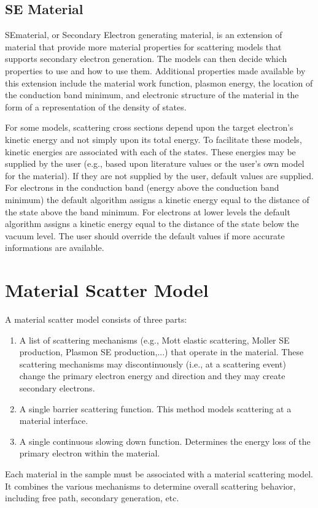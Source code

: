 \subsection{SE Material}\label{subsec:sematerial}
SEmaterial, or Secondary Electron generating material, is an extension of material that provide more material properties for scattering models that supports secondary electron generation. The models can then decide which properties to use and how to use them. Additional properties made available by this extension include the material work function, plasmon energy, the location of the conduction band minimum, and electronic structure of the material in the form of a representation of the density of states. 

For some models, scattering cross sections depend upon the target electron's kinetic energy and not simply upon its total energy. To facilitate these models, kinetic energies are associated with each of the states. These energies may be supplied by the user (e.g., based upon literature values or the user's own model for the material). If they are not supplied by the user, default values are supplied. For electrons in the conduction band (energy above the conduction band minimum) the default algorithm assigns a kinetic energy equal to the distance of the state above the band minimum. For electrons at lower levels the default algorithm assigns a kinetic energy equal to the distance of the state below the vacuum level. The user should override the default values if more accurate informations are available. 

\section{Material Scatter Model}\label{con:msm}
A material scatter model consists of three parts:
\begin{enumerate}
\item A list of scattering mechanisms (e.g., Mott elastic scattering, Moller SE production, Plasmon SE production,...) that operate in the material. These scattering mechanisms may discontinuously (i.e., at a scattering event) change the primary electron energy and direction and they may create secondary electrons. 
\item A single barrier scattering function. This method models scattering at a material interface. 
\item A single continuous slowing down function. Determines the energy loss of the primary electron within the material. 
\end{enumerate}
Each material in the sample must be associated with a material scattering model. It combines the various mechanisms to determine overall scattering behavior, including free path, secondary generation, etc. 

